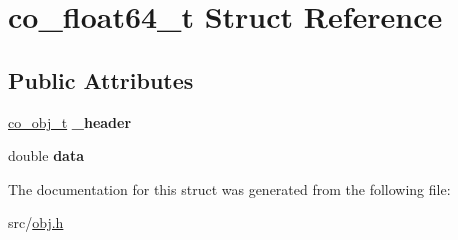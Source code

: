 \hypertarget{structco__float64__t}{\section{co\+\_\+float64\+\_\+t Struct Reference}
\label{structco__float64__t}
}
\subsection*{Public Attributes}
\begin{DoxyCompactItemize}
\item 
\hypertarget{structco__float64__t_a9d9c92206ce5bfb92d84d978996de06e}{\hyperlink{structco__obj__t}{co\+\_\+obj\+\_\+t} {\bfseries \+\_\+header}}\label{structco__float64__t_a9d9c92206ce5bfb92d84d978996de06e}

\item 
\hypertarget{structco__float64__t_ad4638a94649f7986b5d9d2428e6641c4}{double {\bfseries data}}\label{structco__float64__t_ad4638a94649f7986b5d9d2428e6641c4}

\end{DoxyCompactItemize}


The documentation for this struct was generated from the following file\+:\begin{DoxyCompactItemize}
\item 
src/\hyperlink{obj_8h}{obj.\+h}\end{DoxyCompactItemize}

